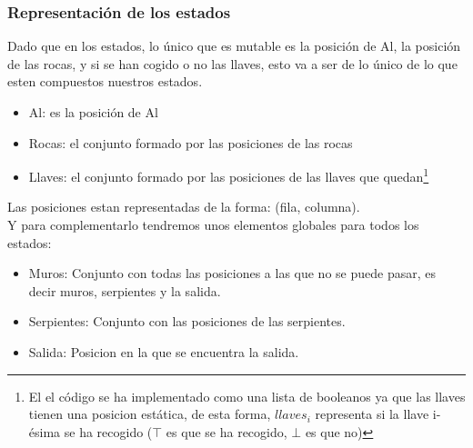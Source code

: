 \documentclass[11pt,spanish]{article}
\begin{document}
			\subsubsection{Representación de los estados}
				Dado que en los estados, lo único que es mutable es la posición de Al, la posición de las rocas, y si se han cogido o no las llaves, esto va a ser de lo único de lo que esten compuestos nuestros estados.
				\begin{itemize}
					\item Al: es la posición de Al
					\item Rocas: el conjunto formado por las posiciones de las rocas
					\item Llaves: el conjunto formado por las posiciones de las llaves que quedan\footnote{El el código se ha implementado como una lista de booleanos ya que las llaves tienen una posicion estática, de esta forma, $llaves_i$ representa si la llave i-ésima se ha recogido ($\top$ es que se ha recogido, $\bot$ es que no)}
				\end{itemize}
				Las posiciones estan representadas de la forma: (fila, columna).\\
				Y para complementarlo tendremos unos elementos globales para todos los estados:
				\begin{itemize}
					\item Muros: Conjunto con todas las posiciones a las que no se puede pasar, es decir muros, serpientes y la salida.
					\item Serpientes: Conjunto con las posiciones de las serpientes.
					\item Salida: Posicion en la que se encuentra la salida.
				\end{itemize}
\end{document}
